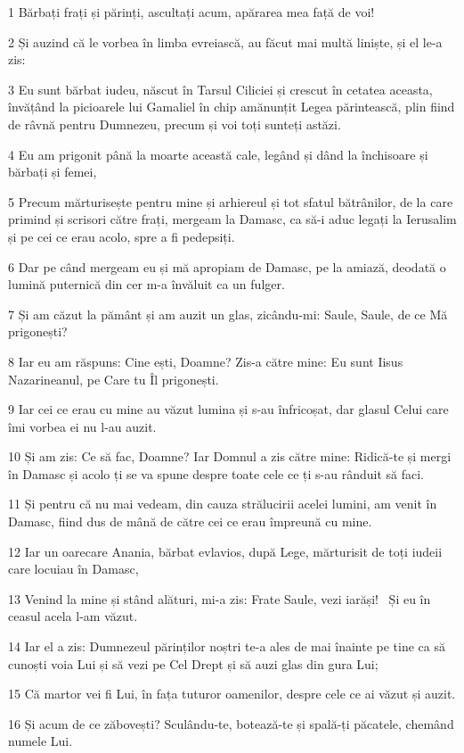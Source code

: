 \par 1 Bărbați frați și părinți, ascultați acum, apărarea mea față de voi!
\par 2 Și auzind că le vorbea în limba evreiască, au făcut mai multă liniște, și el le-a zis:
\par 3 Eu sunt bărbat iudeu, născut în Tarsul Ciliciei și crescut în cetatea aceasta, învățând la picioarele lui Gamaliel în chip amănunțit Legea părintească, plin fiind de râvnă pentru Dumnezeu, precum și voi toți sunteți astăzi.
\par 4 Eu am prigonit până la moarte această cale, legând și dând la închisoare și bărbați și femei,
\par 5 Precum mărturisește pentru mine și arhiereul și tot sfatul bătrânilor, de la care primind și scrisori către frați, mergeam la Damasc, ca să-i aduc legați la Ierusalim și pe cei ce erau acolo, spre a fi pedepsiți.
\par 6 Dar pe când mergeam eu și mă apropiam de Damasc, pe la amiază, deodată o lumină puternică din cer m-a învăluit ca un fulger.
\par 7 Și am căzut la pământ și am auzit un glas, zicându-mi: Saule, Saule, de ce Mă prigonești?
\par 8 Iar eu am răspuns: Cine ești, Doamne? Zis-a către mine: Eu sunt Iisus Nazarineanul, pe Care tu Îl prigonești.
\par 9 Iar cei ce erau cu mine au văzut lumina și s-au înfricoșat, dar glasul Celui care îmi vorbea ei nu l-au auzit.
\par 10 Și am zis: Ce să fac, Doamne? Iar Domnul a zis către mine: Ridică-te și mergi în Damasc și acolo ți se va spune despre toate cele ce ți s-au rânduit să faci.
\par 11 Și pentru că nu mai vedeam, din cauza strălucirii acelei lumini, am venit în Damasc, fiind dus de mână de către cei ce erau împreună cu mine.
\par 12 Iar un oarecare Anania, bărbat evlavios, după Lege, mărturisit de toți iudeii care locuiau în Damasc,
\par 13 Venind la mine și stând alături, mi-a zis: Frate Saule, vezi iarăși!  Și eu în ceasul acela l-am văzut.
\par 14 Iar el a zis: Dumnezeul părinților noștri te-a ales de mai înainte pe tine ca să cunoști voia Lui și să vezi pe Cel Drept și să auzi glas din gura Lui;
\par 15 Că martor vei fi Lui, în fața tuturor oamenilor, despre cele ce ai văzut și auzit.
\par 16 Și acum de ce zăbovești? Sculându-te, botează-te și spală-ți păcatele, chemând numele Lui.
